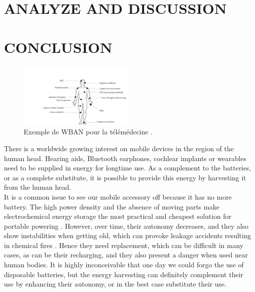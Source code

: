 \documentclass[3p,twocolumn,preprint]{elsarticle}
\begin{document}
\section{ANALYZE AND DISCUSSION}
\label{sec:ANALYZE AND DISCUSSION}

\section{CONCLUSION}
\label{sec:CONCLUSION}

\begin{figure}[!htbp]
	\centering
	\captionsetup{justification=centering}
	\includegraphics[trim={6cm 0cm 0cm 4cm},clip, width=0.5\textwidth]{figures/capteurs_corps_humain.pdf}
	\caption{Exemple de WBAN pour la télémédecine \cite{Abidi2020}.}
	\label{fig:capteurs_corps_humain}
\end{figure}


There is a worldwide growing interest on mobile devices in the region of the human head. Hearing aids, Bluetooth earphones, cochlear implants or wearables need to be supplied in energy for longtime use. As a complement to the batteries, or as a complete substitute, it is possible to provide this energy by harvesting it from the human head.\\
It is a common issue to see our mobile accessory off because it has no more battery. The high power density and the absence of moving parts make electrochemical energy storage the most practical and cheapest solution for portable powering \cite{Jiang2020}. However, over time, their autonomy decreases, and they also show instabilities when getting old, which can provoke leakage accidents resulting in chemical fires \cite{Tian2020}. Hence they need replacement, which can be difficult in many cases, as can be their recharging, and they also present a danger when used near human bodies. It is highly inconceivable that one day we could forgo the use of disposable batteries, but the energy harvesting can definitely complement their use by enhancing their autonomy, or in the best case substitute their use. 
\end{document}
